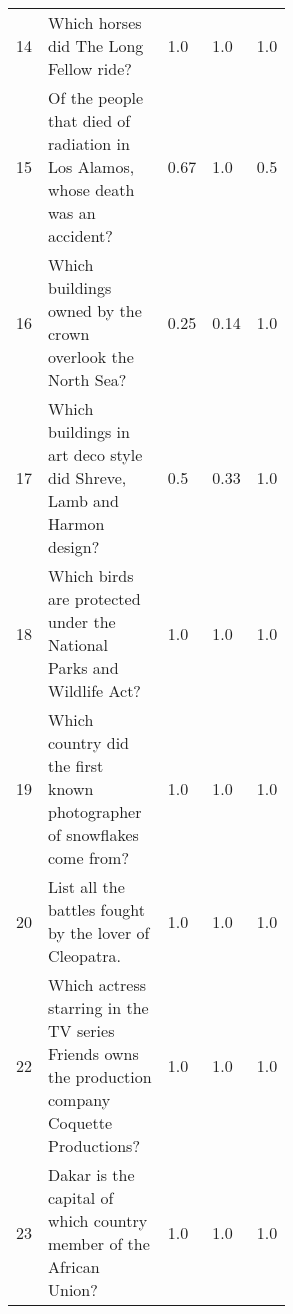 \begin{table}[tb!]
{\begin{tabular}{@{\extracolsep{\fill} } @{}lp{0.55\linewidth}lll@{}}
14          & Which horses did The Long Fellow ride?                                                            & 1.0                & 1.0                & 1.0             \\
\rowcolor[HTML]{9AFF99} 
15          & Of the people that died of radiation in Los Alamos, whose death was an accident?                  & 0.67               & 1.0                & 0.5             \\
\rowcolor[HTML]{BBDAFF} 
16          & Which buildings owned by the crown overlook the North Sea?                                        & 0.25               & 0.14               & 1.0             \\
\rowcolor[HTML]{BBDAFF} 
17          & Which buildings in art deco style did Shreve, Lamb and Harmon design?                             & 0.5                & 0.33               & 1.0             \\
18          & Which birds are protected under the National Parks and Wildlife Act?                              & 1.0                & 1.0                & 1.0             \\
19          & Which country did the first known photographer of snowflakes come from?                           & 1.0                & 1.0                & 1.0             \\
20          & List all the battles fought by the lover of Cleopatra.                                            & 1.0                & 1.0                & 1.0             \\
22          & Which actress starring in the TV series Friends owns the production company Coquette Productions? & 1.0                & 1.0                & 1.0             \\
23          & Dakar is the capital of which country member of the African Union?                                & 1.0                & 1.0                & 1.0             \\ \bottomrule
\end{tabular}}
\label{tab:trainqueries}
\end{table}
